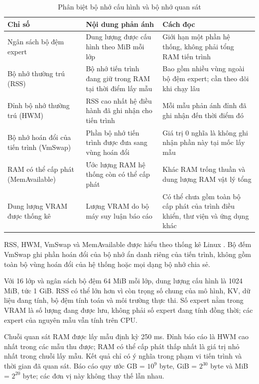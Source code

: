 \begin{table}[htbp]
\centering
\caption{Phân biệt bộ nhớ cấu hình và bộ nhớ quan sát}
\small
\setlength{\tabcolsep}{3pt}
\begin{tabularx}{\textwidth}{>{\RaggedRight\arraybackslash}p{3.5cm} >{\RaggedRight\arraybackslash}p{4cm} >{\RaggedRight\arraybackslash}X}
\toprule
\textbf{Chỉ số} & \textbf{Nội dung phản ánh} & \textbf{Cách đọc} \\
\midrule
Ngân sách bộ đệm expert & Dung lượng được cấu hình theo MiB mỗi lớp & Giới hạn một phần hệ thống, không phải tổng RAM tiến trình \\
Bộ nhớ thường trú (RSS) & Bộ nhớ tiến trình đang giữ trong RAM tại thời điểm lấy mẫu & Bao gồm nhiều vùng ngoài bộ đệm expert; cần theo dõi khi chạy lâu \\
Đỉnh bộ nhớ thường trú (HWM) & RSS cao nhất hệ điều hành đã ghi nhận cho tiến trình & Mỗi mẫu phản ánh đỉnh đã ghi nhận đến thời điểm đó \\
Bộ nhớ hoán đổi của tiến trình (VmSwap) & Phần bộ nhớ tiến trình được đưa sang vùng hoán đổi & Giá trị 0 nghĩa là không ghi nhận phần này tại mốc lấy mẫu \\
RAM có thể cấp phát (MemAvailable) & Ước lượng RAM hệ thống còn có thể cấp phát & Khác RAM trống thuần và dung lượng RAM vật lý tổng \\
Dung lượng VRAM được thống kê & Lượng VRAM do bộ máy suy luận báo cáo & Có thể chưa gồm toàn bộ cấp phát của trình điều khiển, thư viện và ứng dụng khác \\
\bottomrule
\end{tabularx}


\end{table}



RSS, HWM, VmSwap và MemAvailable được hiểu theo thống kê Linux \cite{linux_proc}. Bộ đếm VmSwap ghi phần hoán đổi của bộ nhớ ẩn danh riêng của tiến trình, không gồm toàn bộ vùng hoán đổi của hệ thống hoặc mọi dạng bộ nhớ chia sẻ.

Với 16 lớp và ngân sách bộ đệm 64 MiB mỗi lớp, dung lượng cấu hình là 1024 MiB, tức 1 GiB. RSS có thể lớn hơn vì còn trọng số chung của mô hình, KV, dữ liệu đang tính, bộ đệm tính toán và môi trường thực thi. Số expert nằm trong VRAM là số lượng đang được lưu, không phải số expert đang tính đồng thời; các expert của nguyên mẫu vẫn tính trên CPU.

Chuỗi quan sát RAM được lấy mẫu định kỳ 250 ms. Đỉnh báo cáo là HWM cao nhất trong các mẫu thu được; RAM có thể cấp phát thấp nhất là giá trị nhỏ nhất trong chuỗi lấy mẫu. Kết quả chỉ có ý nghĩa trong phạm vi tiến trình và thời gian đã quan sát. Báo cáo quy ước GB = $10^9$ byte, GiB = $2^{30}$ byte và MiB = $2^{20}$ byte; các đơn vị này không thay thế lẫn nhau.

